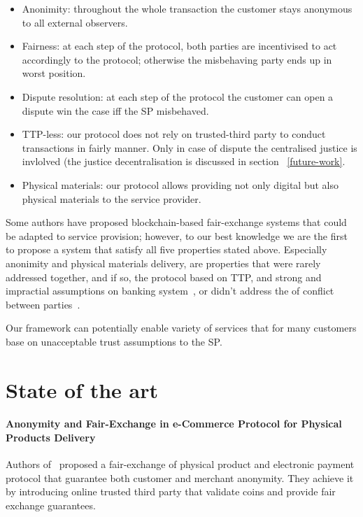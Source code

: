 \documentclass{ieeeaccess}
\begin{document}
\begin{itemize}
\item Anonimity:
throughout the whole transaction the customer stays anonymous to all external observers.
\item Fairness:
at each step of the protocol, both parties are incentivised to act accordingly to the protocol; otherwise the misbehaving party ends up in worst position.
\item Dispute resolution: at each step of the protocol the customer can open a dispute win the case iff the SP misbehaved.
\item TTP-less: our protocol does not rely on trusted-third party to conduct transactions in fairly manner. Only in case of dispute the centralised justice is invlolved (the justice decentralisation is discussed in section ~\ref{future-work}.
\item Physical materials: our protocol allows providing not only
  digital but also physical materials to the service provider.
\end{itemize}

Some authors have proposed blockchain-based fair-exchange systems that
could be adapted to service provision; however, to our best knowledge we
are the first to propose a system that satisfy all five properties
stated above. Especially anonimity and physical materials delivery, are
properties that were rarely addressed together, and if so, the protocol
based on TTP, and strong and impractial assumptions on banking system~\cite{birjoveanu2015anonymity}, or didn't address the of conflict
between parties~\cite{altawy2017lelantos}.

Our framework can potentially enable variety of services that for many
customers base on unacceptable trust assumptions to the SP.


\section{State of the art}\label{state-of-the-art}

\paragraph{Anonymity and Fair-Exchange in e-Commerce Protocol for
Physical Products
Delivery}\label{anonymity-and-fair-exchange-in-e-commerce-protocol-for-physical-products-delivery}

Authors of~\cite{birjoveanu2015anonymity} proposed a
fair-exchange of physical product and electronic payment protocol that
guarantee both customer and merchant anonymity. They achieve it by
introducing online trusted third party that validate coins and provide
fair exchange guarantees.
\end{document}
